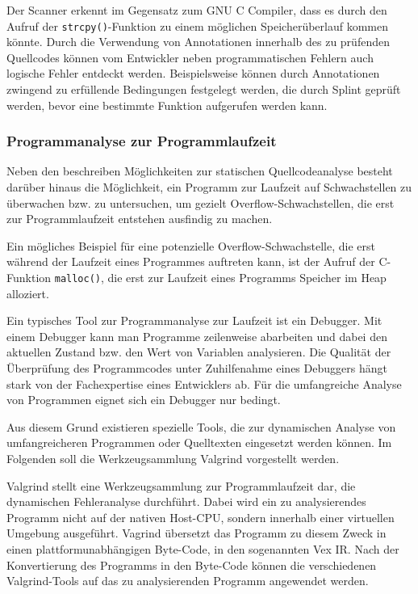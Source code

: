 Der Scanner erkennt im Gegensatz zum GNU C Compiler, dass es durch den 
Aufruf der \texttt{strcpy()}-Funktion zu einem möglichen Speicherüberlauf 
kommen könnte. Durch die Verwendung von Annotationen innerhalb des zu 
prüfenden Quellcodes können vom Entwickler neben programmatischen Fehlern 
auch logische Fehler entdeckt werden. Beispielsweise können durch  
Annotationen zwingend zu erfüllende Bedingungen festgelegt werden, 
die durch Splint geprüft werden, bevor eine bestimmte Funktion aufgerufen 
werden kann.

\subsubsection{Programmanalyse zur Programmlaufzeit}

Neben den beschreiben Möglichkeiten zur statischen Quellcodeanalyse 
besteht darüber hinaus die Möglichkeit, ein Programm zur Laufzeit auf 
Schwachstellen zu überwachen bzw. zu untersuchen, um gezielt 
Overflow-Schwachstellen, die erst zur Programmlaufzeit entstehen 
ausfindig zu machen.

Ein mögliches Beispiel für eine potenzielle Overflow-Schwachstelle, die 
erst während der Laufzeit eines Programmes auftreten kann, ist der 
Aufruf der C-Funktion \texttt{malloc()}, die erst zur Laufzeit eines 
Programms Speicher im Heap alloziert.

Ein typisches Tool zur Programmanalyse zur Laufzeit ist ein Debugger. 
Mit einem Debugger kann man Programme zeilenweise abarbeiten und dabei 
den aktuellen Zustand bzw. den Wert von Variablen analysieren. Die Qualität 
der Überprüfung des Programmcodes unter Zuhilfenahme eines Debuggers 
hängt stark von der Fachexpertise eines Entwicklers ab. Für die umfangreiche 
Analyse von Programmen eignet sich ein Debugger nur bedingt.

Aus diesem Grund existieren spezielle Tools, die zur dynamischen Analyse 
von umfangreicheren Programmen oder Quelltexten eingesetzt werden können. 
Im Folgenden soll die Werkzeugsammlung Valgrind vorgestellt werden.


Valgrind stellt eine Werkzeugsammlung zur Programmlaufzeit dar, die 
dynamischen Fehleranalyse durchführt. Dabei wird ein zu analysierendes 
Programm nicht auf der nativen Host-CPU, sondern innerhalb einer 
virtuellen Umgebung ausgeführt.
Vagrind übersetzt das Programm zu diesem Zweck in einen 
plattformunabhängigen Byte-Code, in den sogenannten Vex IR. Nach der 
Konvertierung des Programms in den Byte-Code können die verschiedenen 
Valgrind-Tools auf das zu analysierenden Programm angewendet werden.

